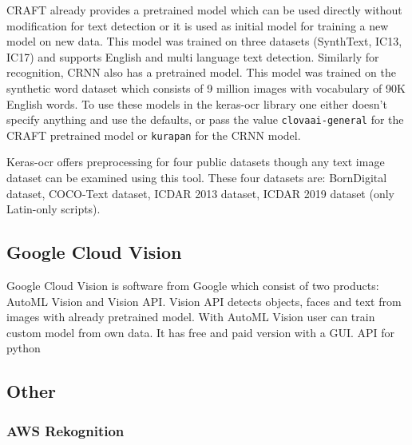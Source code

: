 CRAFT already provides a pretrained model which can be used directly without modification for text detection or it is used as initial model for training a new model on new data. This model was trained on three datasets (SynthText, IC13, IC17) and supports English and multi language text detection.\cite{craft1}
Similarly for recognition, CRNN also has a pretrained model. This model was trained on the synthetic word dataset which consists of 9 million images with vocabulary of 90K English words.\cite{synth}
To use these models in the keras-ocr library one either doesn't specify anything and use the defaults, or pass the value \texttt{clovaai-general} for the CRAFT pretrained model or \texttt{kurapan} for the CRNN model.

Keras-ocr offers preprocessing for four public datasets though any text image dataset can be examined using this tool. These four datasets are: BornDigital dataset, COCO-Text dataset, ICDAR 2013 dataset, ICDAR 2019 dataset (only Latin-only scripts).\cite{keras-ocrDocu}


\subsection{Google Cloud Vision}

Google Cloud Vision is software from Google which consist of two products: AutoML Vision and Vision API. Vision API detects objects, faces and text from images with already pretrained model. With AutoML Vision user can train custom model from own data. It has free and paid version with a GUI.\cite{google1}
API for python

\subsection{Other}

\subsubsection{AWS Rekognition}
